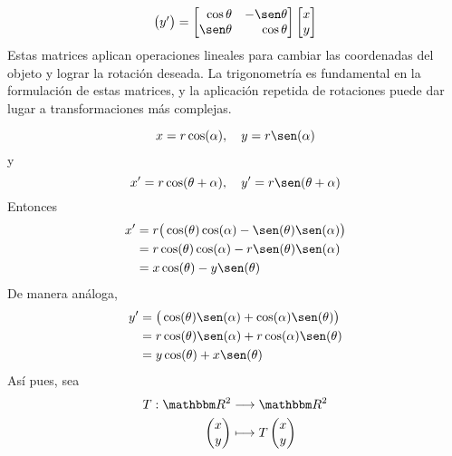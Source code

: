 \begin{example}
{\begin{center}
{{$$\begin{pmatrix}
                y'
            \end{pmatrix} = \begin{bmatrix*}[r]
                \cos \theta & - \sen \theta \\
                \sen \theta & \cos \theta
            \end{bmatrix*} \begin{bmatrix}
                x \\
                y
            \end{bmatrix}$$
            Estas matrices aplican operaciones lineales para cambiar las coordenadas del objeto y lograr la rotación deseada. La trigonometría es fundamental en la formulación de estas matrices, y la aplicación repetida de rotaciones puede dar lugar a transformaciones más complejas.
        }}
    \end{center}
    }
    \begin{equation}
        x = r \cos(\alpha), \quad y = r \sen(\alpha)
    \end{equation}
    y
    \begin{equation}
        x' = r \cos(\theta + \alpha), \quad y' = r \sen(\theta + \alpha)
    \end{equation}
    Entonces
    \begin{align*}
        x' & = r \big( \cos(\theta) \cos(\alpha) - \sen(\theta) \sen(\alpha) \big) \\
        & = r \cos(\theta) \cos(\alpha) - r \sen(\theta) \sen(\alpha) \\
        & = x \cos(\theta) - y \sen(\theta)
    \end{align*}
    De manera análoga,
    \begin{align*}
        y' & = \big( \cos(\theta) \sen(\alpha) + \cos(\alpha) \sen(\theta) \big) \\
        & = r \cos(\theta) \sen(\alpha) + r \cos(\alpha) \sen(\theta) \\
        & = y \cos(\theta) + x \sen(\theta)
    \end{align*}
    Así pues, sea
    \begin{align*}
        T: \RR[2] & \longrightarrow \RR[2] \\
        \begin{pmatrix}
            x \\
            y
        \end{pmatrix} & \longmapsto T \begin{pmatrix}
            x \\
            y

\end{pmatrix}
\end{align*}
\end{example}
